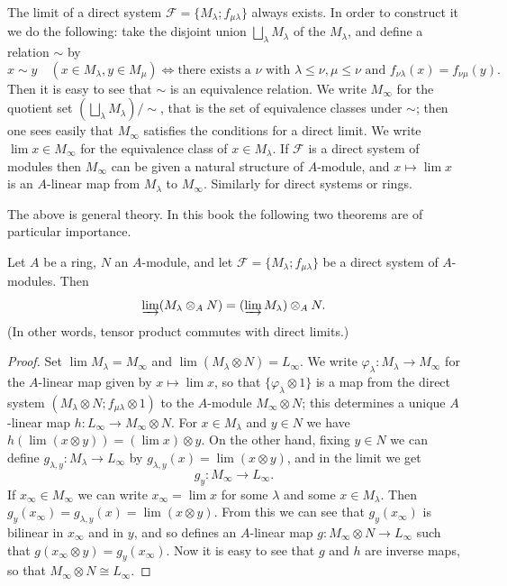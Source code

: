 The limit of a direct system $\mathcal{F} = \{M_\lambda; f_{\mu\lambda}\}$ always exists. In order to
construct it we do the following: take the disjoint union $\bigsqcup_\lambda M_\lambda$ of the
$M_\lambda$, and define a relation $\sim$ by
\[
  x \sim y \quad (x \in M_\lambda, y \in M_\mu) \iff \text{there exists a } \nu
      \text{ with } \lambda \le \nu, \mu \le \nu \text{ and } f_{\nu\lambda}(x) = f_{\nu\mu}(y).
\]
Then it is easy to see that $\sim$ is an equivalence relation. We write $M_\infty$ for the
quotient set $(\bigsqcup_\lambda M_\lambda)/\sim$, that is the set of equivalence classes under $\sim$;
then one sees easily that $M_\infty$ satisfies the conditions for a direct limit. We write
$\lim x \in M_\infty$ for the equivalence class of $x \in M_\lambda$. If $\mathcal{F}$ is a direct system of modules
then $M_\infty$ can be given a natural structure of $A$-module, and
$x \mapsto \lim x$ is an $A$-linear map from $M_\lambda$ to $M_\infty$. Similarly for direct systems
or rings.

The above is general theory. In this book the following two theorems are of
particular importance.

\begin{theorem}\label{thm:A1}
Let $A$ be a ring, $N$ an $A$-module, and let $\mathcal{F} = \{M_\lambda; f_{\mu\lambda}\}$ be a direct
system of $A$-modules. Then
\[
  \varinjlim (M_\lambda \otimes_A N) = (\varinjlim M_\lambda) \otimes_A N.
\]
(In other words, tensor product commutes with direct limits.)
\end{theorem}

\begin{proof}
Set $\lim M_\lambda = M_\infty$ and $\lim(M_\lambda \otimes N) = L_\infty$. We write
$\varphi_\lambda\colon M_\lambda \to M_\infty$ for the $A$-linear map given by $x \mapsto \lim x$, so that
$\{\varphi_\lambda \otimes 1\}$ is a map from the direct system $(M_\lambda \otimes N; f_{\mu\lambda} \otimes 1)$ to the
$A$-module $M_\infty \otimes N$; this determines a unique $A$-linear map
$h\colon L_\infty \to M_\infty \otimes N$. For $x \in M_\lambda$ and $y \in N$ we have
$h(\lim(x \otimes y)) = (\lim x) \otimes y$. On the other hand, fixing $y \in N$ we can define
$g_{\lambda, y}\colon M_\lambda \to L_\infty$ by $g_{\lambda, y}(x) = \lim(x \otimes y)$, and in the limit we get
\[
  g_y\colon M_\infty \to L_\infty.
\]
If $x_\infty \in M_\infty$ we can write $x_\infty = \lim x$ for some $\lambda$ and some $x \in M_\lambda$. Then
$g_y(x_\infty) = g_{\lambda, y}(x) = \lim(x \otimes y)$. From this we can see that $g_y(x_\infty)$ is
bilinear in $x_\infty$ and in $y$, and so defines an $A$-linear map
$g\colon M_\infty \otimes N \to L_\infty$ such that $g(x_\infty \otimes y) = g_y(x_\infty)$. Now it is easy to see
that $g$ and $h$ are inverse maps, so that $M_\infty \otimes N \cong L_\infty$.
\end{proof}

